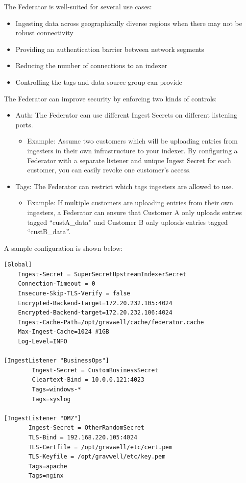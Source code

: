 The Federator is well-suited for several use cases:

\begin{itemize}
\item
  Ingesting data across geographically diverse regions when there may
  not be robust connectivity
\item
  Providing an authentication barrier between network segments
\item
  Reducing the number of connections to an indexer
\item
  Controlling the tags and data source group can provide
\end{itemize}

The Federator can improve security by enforcing two kinds of controls:

\begin{itemize}
\item
  Auth: The Federator can use different Ingest Secrets on different
  listening ports. 
	\begin{itemize}
	\item Example: Assume two customers which will be uploading entries from ingesters in their own infrastructure to your indexer. By configuring a Federator with a separate listener and unique Ingest Secret for each customer, you can easily revoke one customer's access.
	\end{itemize}
\item
  Tags: The Federator can restrict which tags ingesters are allowed to
  use.
	\begin{itemize}
	\item Example: If multiple customers are uploading entries from their own ingesters, a Federator can ensure that Customer A only uploads entries tagged ``custA\_data'' and Customer B only uploads entries tagged ``custB\_data''.
	\end{itemize}
\end{itemize}

A sample configuration is shown below:

\begin{Verbatim}[breaklines=true]
[Global]
    Ingest-Secret = SuperSecretUpstreamIndexerSecret
    Connection-Timeout = 0
    Insecure-Skip-TLS-Verify = false
    Encrypted-Backend-target=172.20.232.105:4024
    Encrypted-Backend-target=172.20.232.106:4024
    Ingest-Cache-Path=/opt/gravwell/cache/federator.cache
    Max-Ingest-Cache=1024 #1GB
    Log-Level=INFO

[IngestListener "BusinessOps"]
        Ingest-Secret = CustomBusinessSecret
        Cleartext-Bind = 10.0.0.121:4023
        Tags=windows-*
        Tags=syslog

[IngestListener "DMZ"]
       Ingest-Secret = OtherRandomSecret
       TLS-Bind = 192.168.220.105:4024
       TLS-Certfile = /opt/gravwell/etc/cert.pem
       TLS-Keyfile = /opt/gravwell/etc/key.pem
       Tags=apache
       Tags=nginx
\end{Verbatim}


